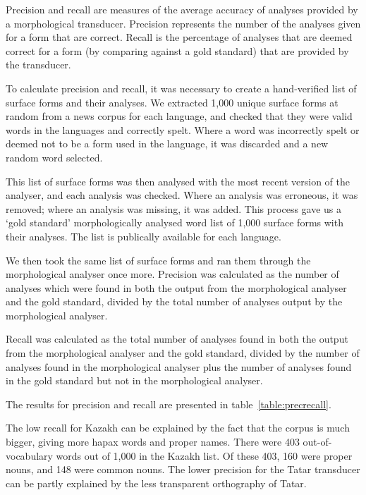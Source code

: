 \documentclass[a4paper,11pt,twocolumn]{article}
\begin{document}
Precision and recall are measures of the average accuracy of analyses provided by a morphological transducer.  Precision represents the number of the analyses given for a form that are correct.  Recall is the percentage of analyses that are deemed correct for a form (by comparing against a gold standard) that are provided by the transducer.

To calculate precision and recall, it was necessary to create a hand-verified list of surface forms and their analyses.  We extracted 1,000 unique surface forms at random from a news corpus for each language, and checked that they were valid words in the languages and correctly spelt.  Where a word was incorrectly spelt or deemed not to be a form used in the language, it was discarded and a new random word selected.

This list of surface forms was then analysed with the most recent version of the analyser, and each analysis was checked.  Where an analysis was erroneous, it was removed; where an analysis was missing, it was added.  This process gave us a `gold standard' morphologically analysed word list of 1,000 surface forms with their analyses.  The list is publically available for each language.%

We then took the same list of surface forms and ran them through the morphological analyser once more.  Precision was calculated as the number of analyses which were found in both the output from the morphological analyser and the gold standard, divided by the total number of analyses output by the morphological analyser.

Recall was calculated as the total number of analyses found in both the output from the morphological analyser and the gold standard, divided by the number of analyses found in the morphological analyser plus the number of analyses found in the gold standard but not in the morphological analyser.

The results for precision and recall are presented in table~\ref{table:precrecall}. 

The low recall for Kazakh can be explained by the fact that the corpus is much bigger, giving 
more hapax words and proper names. There were 403 out-of-vocabulary words out of 1,000 in the Kazakh list.
Of these 403, 160 were proper nouns, and 148 were common nouns. The lower precision for the 
Tatar transducer can be partly explained by the less transparent orthography of Tatar. 
\end{document}
